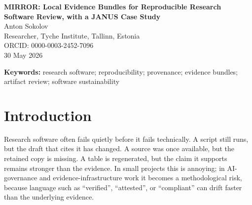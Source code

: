 \documentclass[10pt]{article}
\newcommand{\mirror}{MIRROR}
\begin{document}
\begin{center}
{\LARGE \textbf{\mirror{}: Local Evidence Bundles for Reproducible Research Software Review, with a JANUS Case Study}}\\[4pt]
Anton Sokolov\\
Researcher, Tyche Institute, Tallinn, Estonia\\
ORCID: 0000-0003-2452-7096\\[4pt]
30 May 2026
\end{center}

\begin{abstract}
\mirror{} is a small research-software method for keeping drafts, scripts, source copies, and claim records reviewable while an iterative research project is still moving. A \mirror{} bundle places an artifact, structured claims, provenance notes, source descriptors or retained source copies, assumptions, and SHA-256 digests into a local directory that can be verified offline. This article reports the design as an Issues in Research Software experience paper and uses JANUS, a multilingual drift-triage manuscript and data packet, as the worked case. JANUS is not a second main contribution; it is a deliberately messy case in which claims, generated outputs, source boundaries, public-safe examples, scripts, and reviewer risk had to be separated before release. The central claim is narrow: byte-level replay and schema conformance can reduce the cost of later review, but they do not establish truth, completeness, authorship, legal compliance, public release authority, external timestamping, or regulated assurance. The current \mirror{} implementation passed 115 local tests and positive and negative verifier fixtures, while the JANUS public-safe packet passed its own build, test, checksum, and leakage checks. The main contribution is not another assurance badge, but a boundary discipline: a reviewer should be able to ask what bytes were retained, which claim points to which evidence, what failed, and what still requires human judgment.
\end{abstract}

\textbf{Keywords:} research software; reproducibility; provenance; evidence bundles; artifact review; software sustainability

\section{Introduction}

Research software often fails quietly before it fails technically. A script still runs, but the draft that cites it has changed. A source was once available, but the retained copy is missing. A table is regenerated, but the claim it supports remains stronger than the evidence. In small projects this is annoying; in AI-governance and evidence-infrastructure work it becomes a methodological risk, because language such as ``verified'', ``attested'', or ``compliant'' can drift faster than the underlying evidence.
\end{document}
